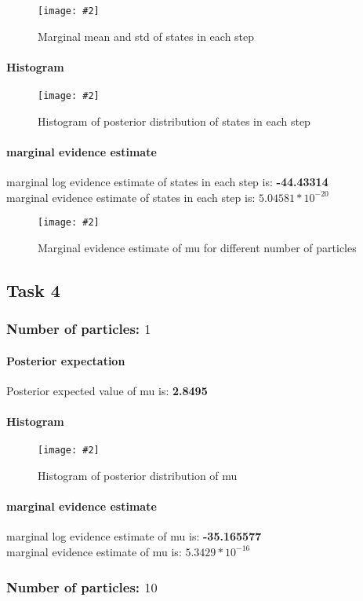 \documentclass{article}
\newcommand{\centerfigcap}[3]{\begin{figure}[H]
\begin{center}\texttt{[image: \#2]} \caption{#3}\end{center}
\end{figure}}
\begin{document}
\centerfigcap{0.6}{../Figures/Mean-Std_3_5}{Marginal mean and std of states in each step}
\paragraph{Histogram}
\centerfigcap{0.6}{../Figures/Histogram_3_5}{Histogram of posterior distribution of states in each step}
\paragraph{marginal evidence estimate}
marginal log evidence estimate of states in each step is: \textbf{-44.43314}\\
marginal evidence estimate of states in each step is: \textbf{$5.04581*10^{-20}$}\\

\centerfigcap{0.6}{../Figures/Evidence_3}{Marginal evidence estimate of mu for different number of particles}


\pagebreak
\subsection{Task 4}
\subsubsection{Number of particles: $1$}
\paragraph{Posterior expectation}
Posterior expected value of mu is: \textbf{2.8495}\\

\paragraph{Histogram}
\centerfigcap{0.6}{../Figures/Histogram_4_0}{Histogram of posterior distribution of mu}
\paragraph{marginal evidence estimate}
marginal log evidence estimate of mu is: \textbf{-35.165577}\\
marginal evidence estimate of mu is: \textbf{$5.3429 * 10^{-16}$}\\

\pagebreak
\subsubsection{Number of particles: $10$}
\end{document}
